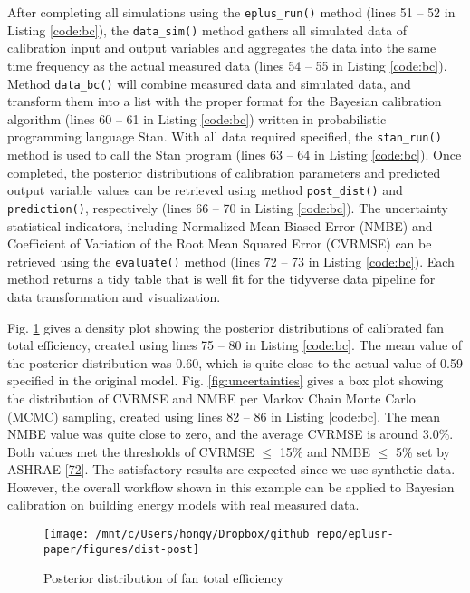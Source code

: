 \documentclass[3p, times]{elsarticle} %
\begin{document}
After completing all simulations using the \texttt{eplus\_run()} method (lines 51 -- 52
in Listing \ref{code:bc}), the \texttt{data\_sim()} method gathers all simulated data
of calibration input and output variables and aggregates the data into the same
time frequency as the actual measured data (lines 54 -- 55 in Listing
\ref{code:bc}). Method \texttt{data\_bc()} will combine measured data and simulated
data, and transform them into a list with the proper format for the Bayesian
calibration algorithm (lines 60 -- 61 in Listing \ref{code:bc}) written in
probabilistic programming language Stan. With all data required specified, the
\texttt{stan\_run()} method is used to call the Stan program (lines 63 -- 64 in Listing
\ref{code:bc}). Once completed, the posterior distributions of calibration
parameters and predicted output variable values can be retrieved using method
\texttt{post\_dist()} and \texttt{prediction()}, respectively (lines 66 -- 70 in Listing
\ref{code:bc}). The uncertainty statistical indicators, including Normalized
Mean Biased Error (NMBE) and Coefficient of Variation of the Root Mean Squared
Error (CVRMSE) can be retrieved using the \texttt{evaluate()} method (lines 72 -- 73 in
Listing \ref{code:bc}). Each method returns a tidy table that is well fit for
the tidyverse data pipeline for data transformation and visualization.

Fig. \ref{fig:dist-post} gives a density plot showing the posterior
distributions of calibrated fan total efficiency, created using lines 75 -- 80
in Listing \ref{code:bc}. The mean value of the posterior distribution was
0.60, which is quite close to the actual value of 0.59 specified in the original
model. Fig. \ref{fig:uncertainties} gives a box plot showing the distribution
of CVRMSE and NMBE per Markov Chain Monte Carlo (MCMC) sampling, created using
lines 82 -- 86 in Listing \ref{code:bc}. The mean NMBE value was quite close to
zero, and the average CVRMSE is around 3.0\%. Both values met the thresholds of
CVRMSE \(\leq\) 15\% and NMBE \(\leq\) 5\% set by ASHRAE {[}\protect\hyperlink{ref-ASHRAE2014}{72}{]}. The
satisfactory results are expected since we use synthetic data. However, the
overall workflow shown in this example can be applied to Bayesian calibration on
building energy models with real measured data.

\begin{figure}[!htb]
\texttt{[image: /mnt/c/Users/hongy/Dropbox/github\_repo/eplusr-paper/figures/dist-post]} \caption{Posterior distribution of fan total efficiency}\label{fig:dist-post}
\end{figure}
\end{document}
